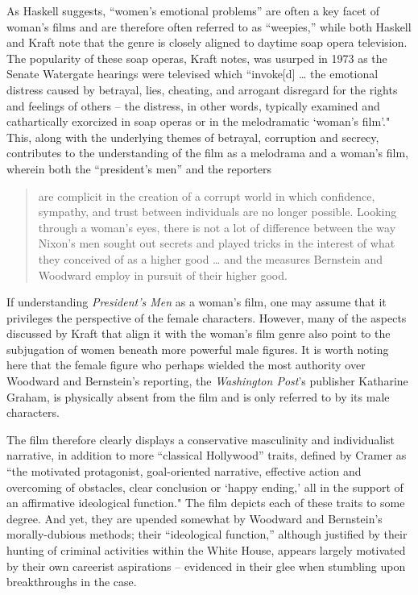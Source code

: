 As Haskell suggests, ``women’s emotional problems” are often a key facet of woman’s films and are therefore often referred to as ``weepies,” while both Haskell and Kraft note that the genre is closely aligned to daytime soap opera television.
The popularity of these soap operas, Kraft notes, was usurped in 1973 as the Senate Watergate hearings were televised which ``invoke[d] … the emotional distress caused by betrayal, lies, cheating, and arrogant disregard for the rights and feelings of others – the distress, in other words, typically examined and cathartically exorcized in soap operas or in the melodramatic `woman’s film’."\autocites[Kraft refers to several features and set pieces that place \textit{All the President's Men} ``in soap opera territory.” For example, the casting of Nicholas Coster, an actor known from the soap opera \textit{Another World}, as the lawyer Markham; the interaction between Markham and Bob Woodward as the lawyer plays dumb in response to the reporter’s questions (00:07:40); and the flirtatious interview Bernstein conducts with a potential source, Sharon Lyons (00:22:26).][31-34]{kraft_all_2008}
This, along with the underlying themes of betrayal, corruption and secrecy, contributes to the understanding of the film as a melodrama and a woman’s film, wherein both the ``president’s men” and the reporters 
\begin{quote}
are complicit in the creation of a corrupt world in which confidence, sympathy, and trust between individuals are no longer possible. Looking through a woman’s eyes, there is not a lot of difference between the way Nixon’s men sought out secrets and played tricks in the interest of what they conceived of as a higher good … and the measures Bernstein and Woodward employ in pursuit of their higher good.\autocites[][35]{kraft_all_2008}
\end{quote}
If understanding \textit{President’s Men} as a woman’s film, one may assume that it privileges the perspective of the female characters.
However, many of the aspects discussed by Kraft that align it with the woman’s film genre also point to the subjugation of women beneath more powerful male figures.
It is worth noting here that the female figure who perhaps wielded the most authority over Woodward and Bernstein’s reporting, the \textit{Washington Post}’s publisher Katharine Graham, is physically absent from the film and is only referred to by its male characters.



The film therefore clearly displays a conservative masculinity and individualist narrative, in addition to more ``classical Hollywood” traits, defined by Cramer as ``the motivated protagonist, goal-oriented narrative, effective action and overcoming of obstacles, clear conclusion or `happy ending,’ all in the support of an affirmative ideological function."\autocites[][180]{cramer_neoliberal_2022}
The film depicts each of these traits to some degree.
And yet, they are upended somewhat by Woodward and Bernstein’s morally-dubious methods; their ``ideological function,” although justified by their hunting of criminal activities within the White House, appears largely motivated by their own careerist aspirations – evidenced in their glee when stumbling upon breakthroughs in the case.

